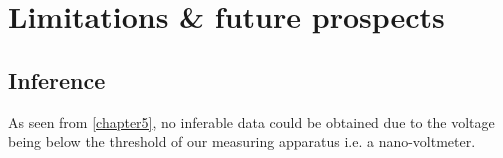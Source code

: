 \chapter{Limitations \& future prospects}

\label{chapter6}

\section{Inference}

As seen from \cref{chapter5}, no inferable data could be obtained due to the voltage being below the threshold of our measuring apparatus i.e. a nano-voltmeter.
